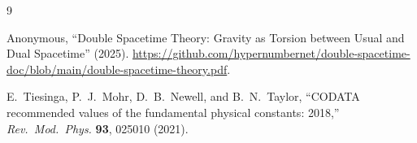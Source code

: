\documentclass[a4paper]{article}
\begin{document}
\begin{thebibliography}{9}

Anonymous,
``Double Spacetime Theory: Gravity as Torsion between Usual and Dual Spacetime'' (2025).
\url{https://github.com/hypernumbernet/double-spacetime-doc/blob/main/double-spacetime-theory.pdf}.

E.~Tiesinga, P.~J.~Mohr, D.~B.~Newell, and B.~N.~Taylor,
``CODATA recommended values of the fundamental physical constants: 2018,''
\textit{Rev.\ Mod.\ Phys.} \textbf{93}, 025010 (2021).

\end{thebibliography}
\end{document}
